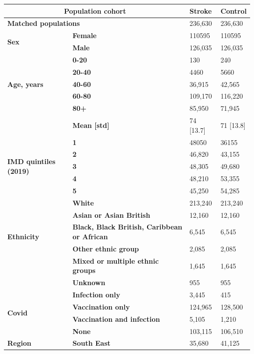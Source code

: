 \begin{table}[!ht]
    \centering
    \begin{tabular}{|l|l|l|l|}
    \hline
        \multicolumn{2}{|c|}{\bf Population cohort} & \bf Stroke & \bf Control \\ \hline
        \multicolumn{2}{|l|}{\bf Matched populations} & 236,630 & 236,630 \\ \hline
        \multirow{2}{*}{\bf Sex} & \bf Female & 110595 & 110595 \\
        & \bf Male & 126,035 & 126,035 \\ \hline
        \multirow{5}{*}{\bf Age, years} & \bf 0-20 & 130 & 240 \\
        & \bf 20-40 & 4460 & 5660 \\
        & \bf 40-60 & 36,915 & 42,565 \\
        & \bf 60-80 & 109,170 & 116,220 \\
        & \bf 80+ & 85,950 & 71,945 \\
        & \bf Mean [std] & 74 [13.7] & 71 [13.8] \\ \hline
        \multirow{5}{*}{\bf IMD quintiles (2019)} & \bf 1 & 48050 & 36155 \\
        & \bf 2 & 46,820 & 43,155 \\
        & \bf 3 & 48,305 & 49,680 \\
        & \bf 4 & 48,210 & 53,355 \\
        & \bf 5 & 45,250 & 54,285 \\ \hline
        \multirow{5}{*}{\bf Ethnicity} & \bf White & 213,240 & 213,240 \\
        & \bf Asian or Asian British & 12,160 & 12,160 \\
        & \bf Black, Black British, Caribbean or African & 6,545 & 6,545 \\
        & \bf Other ethnic group & 2,085 & 2,085 \\
        & \bf Mixed or multiple ethnic groups & 1,645 & 1,645 \\
        & \bf Unknown & 955 & 955 \\ \hline
        \multirow{4}{*}{\bf Covid} & \bf Infection only & 3,445 & 415 \\
        & \bf Vaccination only & 124,965 & 128,500 \\
        & \bf Vaccination and infection & 5,105 & 1,210 \\
        & \bf None & 103,115 & 106,510 \\ \hline
        \multirow{9}{*}{\bf Region} & \bf South East & 35,680 & 41,125 \\

\end{tabular}
\end{table}
